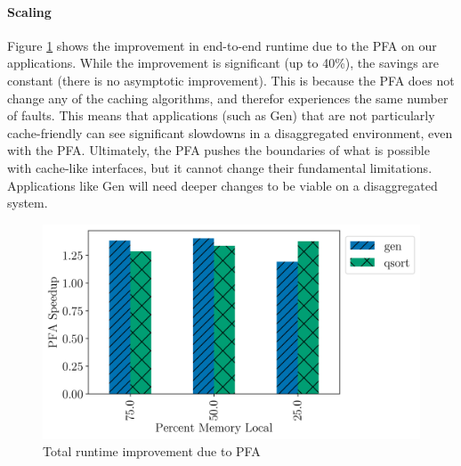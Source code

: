   \paragraph{Scaling}
  Figure \ref{fig:pfa_total_speedup} shows the improvement in end-to-end
  runtime due to the PFA on our applications. While the improvement is
  significant (up to 40\%), the savings are constant (there is no asymptotic
  improvement). This is because the PFA does not change any of the caching
  algorithms, and therefor experiences the same number of faults. This means
  that applications (such as Gen) that are not particularly cache-friendly can
  see significant slowdowns in a disaggregated environment, even with the PFA.
  Ultimately, the PFA pushes the boundaries of what is possible with cache-like
  interfaces, but it cannot change their fundamental limitations. Applications
  like Gen will need deeper changes to be viable on a disaggregated system.

  \begin{figure}[h] \centering
    \includegraphics[width=0.6\columnwidth]{figs/total_speedup.png}
    \vspace{-5mm}
    \caption{Total runtime improvement due to PFA}
    \label{fig:pfa_total_speedup}
  \end{figure}
 
